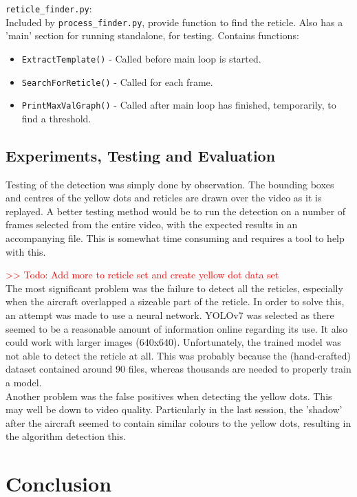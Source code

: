 \documentclass[final]{cmpreport_02}
\begin{document}
\verb|reticle_finder.py|:\\
Included by \verb|process_finder.py|, provide function to find the reticle. Also has a 'main' section for running standalone, for testing.
Contains functions:
\begin{itemize}
	\item \verb|ExtractTemplate()| - Called before main loop is started.
	\item \verb|SearchForReticle()| - Called for each frame.
	\item \verb|PrintMaxValGraph()| - Called after main loop has finished, temporarily, to find a threshold.
\end{itemize}


\subsection{Experiments, Testing and Evaluation}

Testing of the detection was simply done by observation. The bounding boxes and centres of the yellow dots and reticles are drawn over the video as it is replayed. A better testing method would be to run the detection on a number of frames selected from the entire video, with the expected results in an accompanying file. This is somewhat time consuming and requires a tool to help with this.

\noindent
\textcolor{red}{>> Todo: Add more to reticle set and create yellow dot data set}\\

The most significant problem was the failure to detect all the reticles, especially when the aircraft overlapped a sizeable part of the reticle. In order to solve this, an attempt was made to use a neural network. YOLOv7 was selected as there seemed to be a reasonable amount of information online regarding its use. It also could work with larger images (640x640). Unfortunately, the trained model was not able to detect the reticle at all. This was probably because the (hand-crafted) dataset contained around 90 files, whereas thousands are needed to properly train a model.
\\
Another problem was the false positives when detecting the yellow dots. This may well be down to video quality. Particularly in the last session, the 'shadow' after the aircraft seemed to contain similar colours to the yellow dots, resulting in the algorithm detection this.

\section{Conclusion}


\clearpage




\clearpage
\appendix


%
\end{document}
